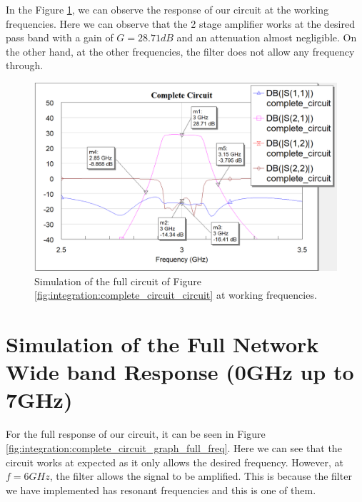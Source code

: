 \documentclass[12pt]{report} %
\let\oldsection\section
\renewcommand\section{\clearpage\oldsection}
\begin{document}
In the Figure \ref{fig:integration:complete_circuit_graph_working_freq}, we can observe the response of our circuit at the working frequencies. Here we can observe that the 2 stage amplifier works at the desired pass band with a gain of $G = 28.71 dB$ and an attenuation almost negligible. On the other hand, at the other frequencies, the filter does not allow any frequency through.

\begin{figure}[htbp]
    \centering
    \includegraphics[width=1\linewidth]{images//integration/complete_circuit_graph_working_freq.png}
    \caption{Simulation of the full circuit of Figure \ref{fig:integration:complete_circuit_circuit} at working frequencies.}
    \label{fig:integration:complete_circuit_graph_working_freq}
\end{figure}

\section{Simulation of the Full Network Wide band Response (0GHz up to 7GHz)}

For the full response of our circuit, it can be seen in Figure \ref{fig:integration:complete_circuit_graph_full_freq}. Here we can see that the circuit works at expected as it only allows the desired frequency. However, at $f = 6 GHz$, the filter allows the signal to be amplified. This is because the filter we have implemented has resonant frequencies and this is one of them.
\end{document}
